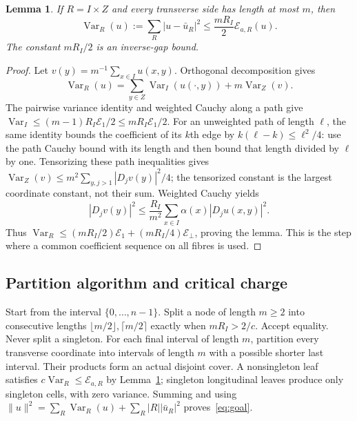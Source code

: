 \documentclass[11pt]{article}
\newtheorem{lemma}[theorem]{Lemma}
\newcommand{\Var}{\operatorname{Var}}
\newcommand{\E}{\mathcal E}
\begin{document}
\begin{lemma}\label{lem:local}
If $R=I\times Z$ and every transverse side has length at most $m$, then
\begin{equation}\label{eq:local}
 \Var_R(u):=\sum_R|u-\bar u_R|^2\le\frac{mR_I}{2}\E_{a,R}(u).
\end{equation}
The constant $mR_I/2$ is an inverse-gap bound.
\end{lemma}
\begin{proof}
Let $v(y)=m^{-1}\sum_{x\in I}u(x,y)$. Orthogonal decomposition gives
\[
 \Var_R(u)=\sum_{y\in Z}\Var_I(u(\cdot,y))+m\Var_Z(v).
\]
The pairwise variance identity and weighted Cauchy along a path give
$\Var_I\le(m-1)R_I\E_1/2\le mR_I\E_1/2$.
For an unweighted path of length $\ell$, the same identity bounds the
coefficient of its $k$th edge by $k(\ell-k)\le\ell^2/4$:
use the path Cauchy bound with its length and then bound that length
divided by $\ell$ by one. Tensorizing these path inequalities gives
$\Var_Z(v)\le m^2\sum_{y,j>1}|D_jv(y)|^2/4$; the tensorized constant
is the largest coordinate constant, not their sum. Weighted Cauchy yields
\[
 |D_jv(y)|^2\le\frac{R_I}{m^2}
      \sum_{x\in I}\alpha(x)|D_ju(x,y)|^2.
\]
Thus $\Var_R\le(mR_I/2)\E_1+(mR_I/4)\E_\perp$, proving the lemma.
This is the step where a common coefficient sequence on all fibres is used.
\end{proof}

\subsection{Partition algorithm and critical charge}
Start from the interval $\{0,\ldots,n-1\}$. Split a node of length $m\ge2$
into consecutive lengths $\lfloor m/2\rfloor,\lceil m/2\rceil$ exactly
when $mR_I>2/c$. Accept equality. Never split a singleton. For each final
interval of length $m$, partition every transverse coordinate into intervals
of length $m$ with a possible shorter last interval. Their products form
an actual disjoint cover. A nonsingleton leaf satisfies
$c\Var_R\le\E_{a,R}$ by Lemma~\ref{lem:local}; singleton longitudinal
leaves produce only singleton cells, with zero variance. Summing and using
$\|u\|^2=\sum_R\Var_R(u)+\sum_R|R||\bar u_R|^2$ proves~\eqref{eq:goal}.
\end{document}
